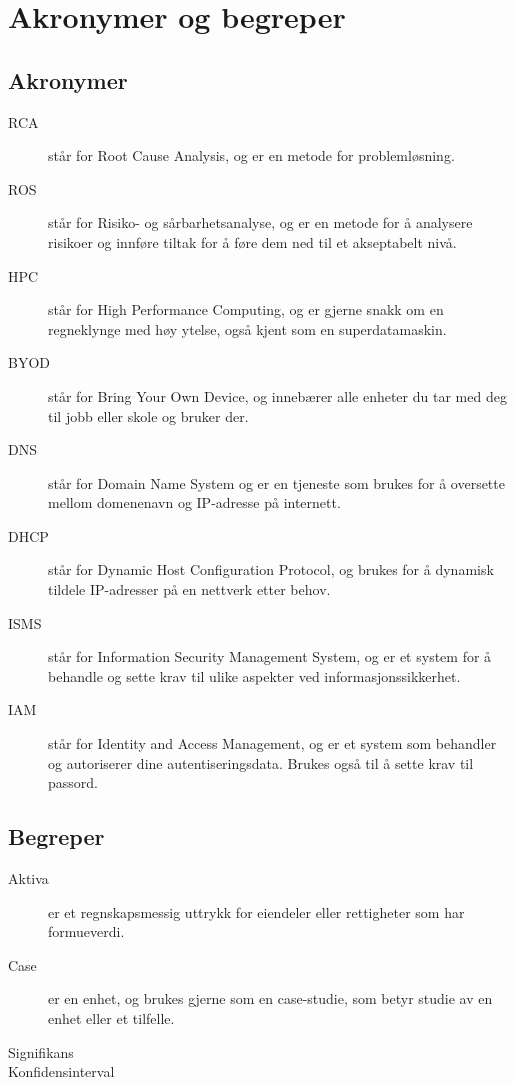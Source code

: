 \chapter*{Akronymer og begreper}
\label{kap:akronymer}

\section*{Akronymer}
\begin{description}
    \item[RCA] står for Root Cause Analysis, og er en metode for problemløsning.
    \item[ROS] står for Risiko- og sårbarhetsanalyse, og er en metode for å analysere risikoer og innføre tiltak for å føre dem ned til et akseptabelt nivå.
    \item[HPC] står for High Performance Computing, og er gjerne snakk om en regneklynge med høy ytelse, også kjent som en superdatamaskin.
    \item[BYOD] står for Bring Your Own Device, og innebærer alle enheter du tar med deg til jobb eller skole og bruker der.
    \item[DNS] står for Domain Name System og er en tjeneste som brukes for å oversette mellom domenenavn og IP-adresse på internett.
    \item[DHCP] står for Dynamic Host Configuration Protocol, og brukes for å dynamisk tildele IP-adresser på en nettverk etter behov.
    \item[ISMS] står for Information Security Management System, og er et system for å behandle og sette krav til ulike aspekter ved informasjonssikkerhet.
    \item[IAM] står for Identity and Access Management, og er et system som behandler og autoriserer dine autentiseringsdata. Brukes også til å sette krav til passord. 
\end{description}


\section*{Begreper}
\begin{description}
    \item[Aktiva] er et regnskapsmessig uttrykk for eiendeler eller rettigheter som har formueverdi.
    \item[Case] er en enhet, og brukes gjerne som en case-studie, som betyr studie av en enhet eller et tilfelle.
    \item[Signifikans] 
    \item[Konfidensinterval] 
\end{description}